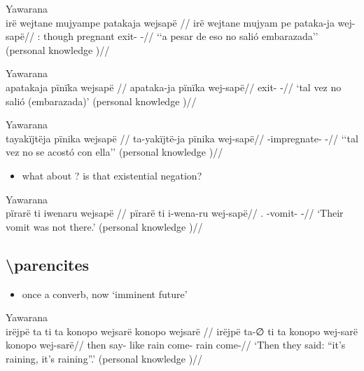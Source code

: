 \documentclass{memoir}
\begin{document}
\ex  Yawarana  \\\label{ctoaragrme-38}
\begingl \glpreamble irë wejtane mujyampe patakaja wejsapë //
\gla irë wejtane mujyam pe pataka-ja wej-sapë//
\glb {}: though pregnant  exit- -//
\glft ‘‘a pesar de eso no salió embarazada’’ (personal knowledge
)//
\endgl
\xe

\ex  Yawarana  \\\label{ctoaragrme-39}
\begingl \glpreamble apatakaja pïnïka wejsapë //
\gla apataka-ja pïnïka wej-sapë//
\glb exit-  -//
\glft ‘tal vez no salió (embarazada)’ (personal knowledge
)//
\endgl
\xe

\ex  Yawarana  \\\label{ctoaragrme-40}
\begingl \glpreamble tayakïjtëja pïnika wejsapë //
\gla ta-yakïjtë-ja pïnika wej-sapë//
\glb {}-impregnate-  -//
\glft ‘‘tal vez no se acostó con ella’’ (personal knowledge
)//
\endgl
\xe

\begin{itemize}
\tightlist
\item
  what about ? is that existential negation?
\end{itemize}

\ex  Yawarana  \\\label{ctorat-19}
\begingl \glpreamble pïrarë ti iwenaru wejsapë //
\gla pïrarë ti i-wena-ru wej-sapë//
\glb {}.  -vomit- -//
\glft ‘Their vomit was not there.’ (personal knowledge
)//
\endgl
\xe

\subsection{\texorpdfstring{ \textbackslash parencites
\label{sec:sareimn}}{ \textbackslash parencites }}

\begin{itemize}
\tightlist
\item
  once a converb, now `imminent future'
\end{itemize}

\ex  Yawarana  \\\label{ctorat-25}
\begingl \glpreamble irëjpë ta ti ta konopo wejsarë konopo wejsarë //
\gla irëjpë ta-∅ ti ta konopo wej-sarë konopo wej-sarë//
\glb then say-  like rain come- rain come-//
\glft ‘Then they said: “it’s raining, it’s raining”.’ (personal knowledge
)//
\endgl
\xe
\end{document}
